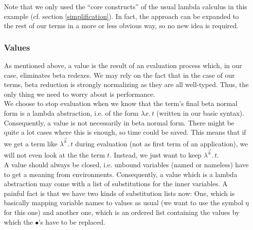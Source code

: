 \documentclass[12pt, a4paper, titlepage]{article}
\newcommand{\ovar}{\mathord{\bullet}}
\newcommand{\sspace}{\,}
\newcommand{\la}{\lambda}
\newcommand{\LaA}[2]{\la {#1}. \sspace #2}
\newcommand{\LaO}[2]{\la ^{#1} . \sspace #2}
\begin{document}
Note that we only used the ``core constructs'' of the usual lambda calculus in this example (cf. section \ref{simplification}). In fact, the approach can be expanded to the rest of our terms in a more or less obvious way, so no new idea is required.



\subsubsection{Values} \label{ovalues}

As mentioned above, a value is the result of an evaluation process which, in our case, eliminates beta redexes.
We may rely on the fact that in the case of our terms, beta reduction is strongly normalizing as they are all well-typed.
Thus, the only thing we need to worry about is performance. \\
We choose to stop evaluation when we know that the term's final beta normal form is a lambda abstraction, i.e. of the form $\LaA x t$ (written in our basic syntax). Consequently, a value is not necessarily 
in beta normal form.
There might be quite a lot cases where this is enough, so time could be saved. 
This means that if we get a term like $\LaO {\vec k} t$ during evaluation (not as first term of an application), we will not even look at the the term $t$. Instead, we just want to keep $\LaO {\vec k} t$. \\
A value should always be closed, i.e. unbound variables (named or nameless) have to get a meaning from environments. 
Consequently, a value which is a lambda abstraction may come with a list of substitutions for the inner variables. 
A painful fact is that we have two kinds of substitution lists now: One, which is basically mapping variable names to values as usual (we want to use the symbol $\eta$ for this one) and another one, which is an ordered list containing the values by which the $\ovar$'s have to be replaced.
\end{document}
